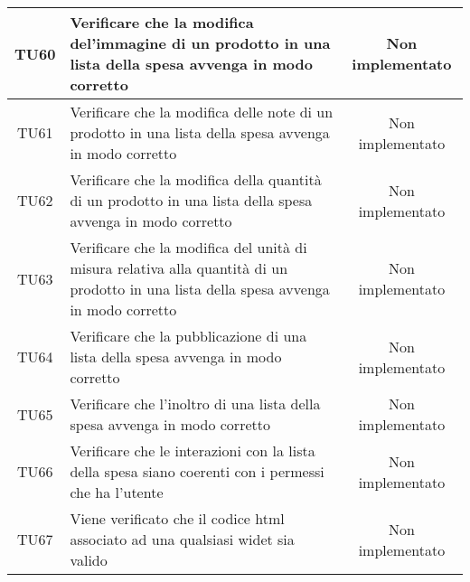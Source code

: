 \begin{center}
\begin{longtable}{|c|>{\centering}m{10cm}|c|}
		TU60 & Verificare che la modifica del'immagine di un prodotto in una lista della spesa avvenga in modo corretto & Non implementato \\ \hline
		TU61 & Verificare che la modifica delle note di un prodotto in una lista della spesa avvenga in modo corretto & Non implementato \\ \hline
		TU62 & Verificare che la modifica della quantità di un prodotto in una lista della spesa avvenga in modo corretto & Non implementato \\ \hline
		TU63 & Verificare che la modifica del unità di misura relativa alla quantità di un prodotto in una lista della spesa avvenga in modo corretto & Non implementato \\ \hline
		TU64 & Verificare che la pubblicazione di una lista della spesa avvenga in modo corretto & Non implementato \\ \hline
		TU65 & Verificare che l'inoltro di una lista della spesa avvenga in modo corretto & Non implementato \\ \hline
		TU66 & Verificare che le interazioni con la lista della spesa siano coerenti con i permessi che ha l'utente & Non implementato \\ \hline
		TU67 & Viene verificato che il codice html associato ad una qualsiasi widet sia valido & Non implementato \\ \hline
	\end{longtable}
\end{center}
